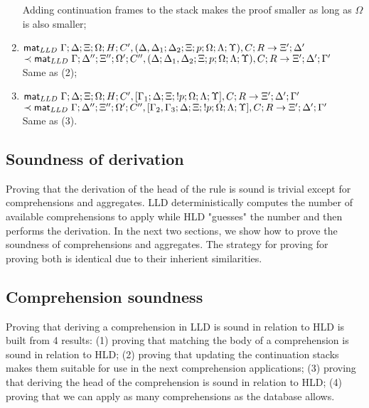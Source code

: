 \begin{enumerate}
   Adding continuation frames to the stack makes the proof smaller as long as $\Omega$ is also smaller; 
   \item $\mathsf{mat}_{LLD} \; \Gamma; \Delta; \Xi; \Omega; H; C', (\Delta, \Delta_1; \Delta_2; \Xi; p; \Omega; \Lambda; \Upsilon), C; R \rightarrow \Xi'; \Delta'$\\
   \hspace*{1cm} $\prec \mathsf{mat}_{LLD} \; \Gamma; \Delta''; \Xi''; \Omega'; C'', (\Delta; \Delta_1, \Delta_2; \Xi; p; \Omega; \Lambda; \Upsilon), C; R \rightarrow \Xi'; \Delta'; \Gamma'$\\
   Same as (2);
   \item $\mathsf{mat}_{LLD} \; \Gamma; \Delta; \Xi; \Omega; H; C', [\Gamma_1; \Delta; \Xi; {!} p; \Omega; \Lambda; \Upsilon], C; R \rightarrow \Xi'; \Delta'; \Gamma'$\\
   \hspace*{1cm} $\prec \mathsf{mat}_{LLD} \; \Gamma; \Delta''; \Xi''; \Omega'; C'', [\Gamma_2, \Gamma_3; \Delta; \Xi; {!} p; \Omega; \Lambda; \Upsilon], C; R \rightarrow \Xi'; \Delta'; \Gamma'$\\
   Same as (3).
\end{enumerate}

\subsection{Soundness of derivation}

Proving that the derivation of the head of the rule is sound is trivial except
for comprehensions and aggregates. LLD deterministically computes the number of
available comprehensions to apply while HLD "guesses" the number and then
performs the derivation. In the next two sections, we show how to prove the
soundness of comprehensions and aggregates. The strategy for proving for proving
both is identical due to their inherient similarities.

\subsection{Comprehension soundness}

Proving that deriving a comprehension in LLD is sound in relation to HLD is
built from 4 results: (1) proving that matching the body of a comprehension is
sound in relation to HLD; (2) proving that updating the continuation stacks
makes them suitable for use in the next comprehension applications; (3) proving
that deriving the head of the comprehension is sound in relation to HLD; (4)
proving that we can apply as many comprehensions as the database allows.


